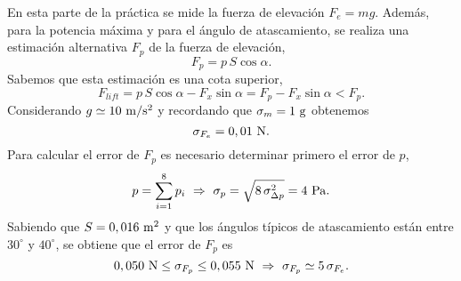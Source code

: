 En esta parte de la pr\'actica se mide la fuerza de elevaci\'on $F_e = mg$. Adem\'as, para la potencia m\'axima y para el \'angulo de atascamiento, se realiza una estimaci\'on alternativa $F_p$ de la fuerza de elevaci\'on,
%
\begin{equation*}
  F_p = p\,S\cos\alpha.
\end{equation*}
%
Sabemos que esta estimaci\'on es una cota superior,
%
\begin{equation*}
  F_{lift} = p\,S\cos\alpha - F_x\sin\alpha = F_p - F_x\sin\alpha < F_p.
\end{equation*}
%
Considerando $g \simeq 10~{\rm m/s^2}$ y recordando que $\sigma_m = 1~{\rm g}$ obtenemos
%
\begin{equation*}
  \sigma_{F_e} = 0,01~{\rm N}.
\end{equation*}
%
Para calcular el error de $F_p$ es necesario determinar primero el error de $p$,
%
\begin{equation*}
  p = \sum_{i=1}^{8} p_i ~\Rightarrow~ \sigma_p = \sqrt{8\,\sigma_{\Delta p}^2} = 4~{\rm Pa}.
\end{equation*}
%
Sabiendo que $S = 0,016~{\rm m^2}$ y que los \'angulos t\'ipicos de atascamiento est\'an entre $30^{\circ}$ y $40^{\circ}$, se obtiene que el error de $F_p$ es
%
\begin{equation*}
  0,050~{\rm N} \leq \sigma_{F_p} \leq 0,055~{\rm N} ~\Rightarrow~ \sigma_{F_p} \simeq 5\,\sigma_{F_e}.
\end{equation*}
